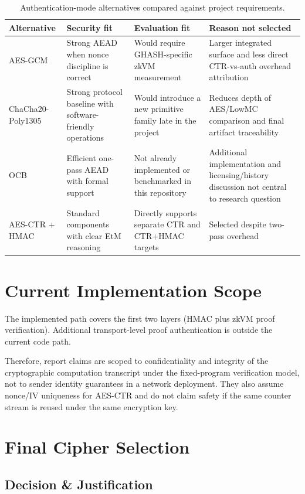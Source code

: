 \begin{table}[H]
\centering
\reporttablesetup
\begin{tabularx}{\textwidth}{@{}P{0.16\textwidth}LLL@{}}
\hline
Alternative & Security fit & Evaluation fit & Reason not selected \\
\hline
AES-GCM & Strong AEAD when nonce discipline is correct & Would require
GHASH-specific zkVM measurement & Larger integrated surface and less direct
CTR-vs-auth overhead attribution \\
ChaCha20-Poly1305 & Strong protocol baseline with software-friendly operations &
Would introduce a new primitive family late in the project & Reduces depth of
AES/LowMC comparison and final artifact traceability \\
OCB & Efficient one-pass AEAD with formal support & Not already implemented or
benchmarked in this repository & Additional implementation and licensing/history
discussion not central to research question \\
AES-CTR + HMAC & Standard components with clear EtM reasoning & Directly
supports separate CTR and CTR+HMAC targets & Selected despite two-pass overhead \\
\hline
\end{tabularx}
\caption{Authentication-mode alternatives compared against project requirements.}
\label{tab:auth-alternatives}
\end{table}

\section{Current Implementation Scope}

The implemented path covers the first two layers (HMAC plus zkVM proof
verification). Additional transport-level proof authentication is outside the
current code path.

Therefore, report claims are scoped to confidentiality and integrity of the
cryptographic computation transcript under the fixed-program verification model,
not to sender identity guarantees in a network deployment. They also assume
nonce/IV uniqueness for AES-CTR and do not claim safety if the same counter stream
is reused under the same encryption key.

\section{Final Cipher Selection}

\subsection{Decision \& Justification}

